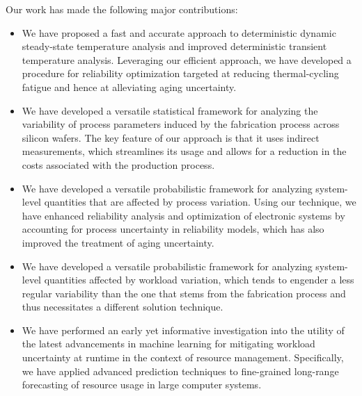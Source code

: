 Our work has made the following major contributions:

\begin{itemize}

\item
We have proposed a fast and accurate approach to deterministic dynamic
steady-state temperature analysis and improved deterministic transient
temperature analysis. Leveraging our efficient approach, we have developed a
procedure for reliability optimization targeted at reducing thermal-cycling
fatigue and hence at alleviating aging uncertainty.

\item
We have developed a versatile statistical framework for analyzing the
variability of process parameters induced by the fabrication process across
silicon wafers. The key feature of our approach is that it uses indirect
measurements, which streamlines its usage and allows for a reduction in the
costs associated with the production process.

\item
We have developed a versatile probabilistic framework for analyzing system-level
quantities that are affected by process variation. Using our technique, we have
enhanced reliability analysis and optimization of electronic systems by
accounting for process uncertainty in reliability models, which has also
improved the treatment of aging uncertainty.

\item
We have developed a versatile probabilistic framework for analyzing system-level
quantities affected by workload variation, which tends to engender a less
regular variability than the one that stems from the fabrication process and
thus necessitates a different solution technique.

\item
We have performed an early yet informative investigation into the utility of the
latest advancements in machine learning for mitigating workload uncertainty at
runtime in the context of resource management. Specifically, we have applied
advanced prediction techniques to fine-grained long-range forecasting of
resource usage in large computer systems.

\end{itemize}

